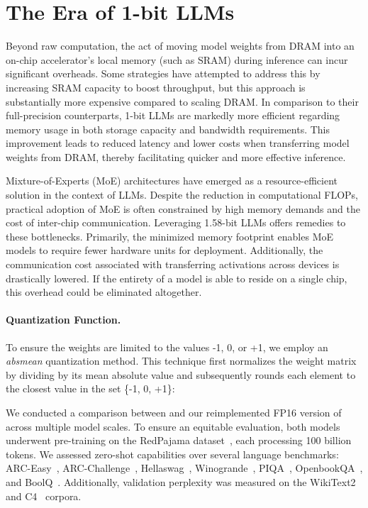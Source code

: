 \section{The Era of 1-bit LLMs}

Beyond raw computation, the act of moving model weights from DRAM into an on-chip accelerator’s local memory (such as SRAM) during inference can incur significant overheads. Some strategies have attempted to address this by increasing SRAM capacity to boost throughput, but this approach is substantially more expensive compared to scaling DRAM. In comparison to their full-precision counterparts, 1-bit LLMs are markedly more efficient regarding memory usage in both storage capacity and bandwidth requirements. This improvement leads to reduced latency and lower costs when transferring model weights from DRAM, thereby facilitating quicker and more effective inference.

Mixture-of-Experts (MoE) architectures have emerged as a resource-efficient solution in the context of LLMs. Despite the reduction in computational FLOPs, practical adoption of MoE is often constrained by high memory demands and the cost of inter-chip communication. Leveraging 1.58-bit LLMs offers remedies to these bottlenecks. Primarily, the minimized memory footprint enables MoE models to require fewer hardware units for deployment. Additionally, the communication cost associated with transferring activations across devices is drastically lowered. If the entirety of a model is able to reside on a single chip, this overhead could be eliminated altogether.

\paragraph{Quantization Function.} To ensure the weights are limited to the values -1, 0, or +1, we employ an \emph{absmean} quantization method. This technique first normalizes the weight matrix by dividing by its mean absolute value and subsequently rounds each element to the closest value in the set \{-1, 0, +1\}:

We conducted a comparison between  and our reimplemented FP16 version of  across multiple model scales. To ensure an equitable evaluation, both models underwent pre-training on the RedPajama dataset~\cite{redpajama}, each processing 100 billion tokens. We assessed zero-shot capabilities over several language benchmarks: ARC-Easy~\cite{arc}, ARC-Challenge~\cite{arc}, Hellaswag~\cite{hellaswag}, Winogrande~\cite{winoGrande}, PIQA~\cite{piqa}, OpenbookQA~\cite{openbookqa}, and BoolQ~\cite{boolq}. Additionally, validation perplexity was measured on the WikiText2~\cite{wikitext2} and C4~\cite{c4} corpora.

